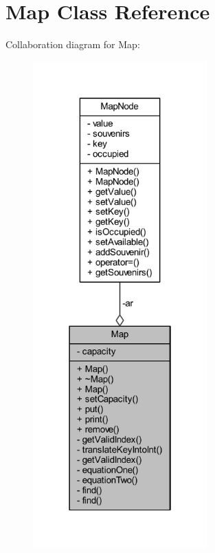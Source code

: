 \hypertarget{class_map}{}\section{Map Class Reference}
\label{class_map}


Collaboration diagram for Map\+:\nopagebreak
\begin{figure}[H]
\begin{center}
\leavevmode
\includegraphics[width=190pt]{class_map__coll__graph}
\end{center}
\end{figure}
